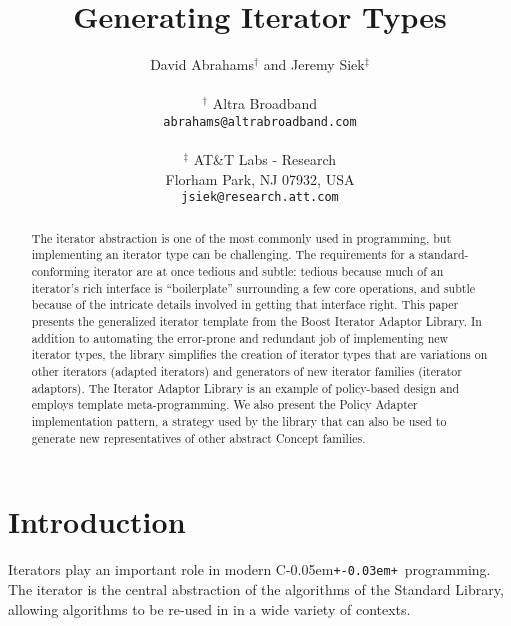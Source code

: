 \documentclass{netobjectdays}
\newcommand{\Cpp}{C\kern-0.05em\texttt{+\kern-0.03em+}}
\begin{document}
\title{Generating Iterator Types}

\author{David Abrahams$^\dag$ and Jeremy Siek$^\ddag$ \\
\\
$^\dag$ Altra Broadband \\
\texttt{abrahams@altrabroadband.com}\\
\\
$^\ddag$ AT\&T Labs - Research \\
Florham Park, NJ 07932, USA \\
\texttt{jsiek@research.att.com}
}

\maketitle

 \begin{abstract} $\!$The iterator abstraction is one of the most
commonly used in programming, but implementing an iterator type can be
challenging. The requirements for a standard-conforming iterator are
at once tedious and subtle: tedious because much of an iterator's rich
interface is ``boilerplate'' surrounding a few core operations, and
subtle because of the intricate details involved in getting that
interface right. This paper presents the generalized iterator template
from the Boost Iterator Adaptor Library. In addition to automating the
error-prone and redundant job of implementing new iterator types, the
library simplifies the creation of iterator types that are variations
on other iterators (adapted iterators) and generators of new iterator
families (iterator adaptors). The Iterator Adaptor Library is an
example of policy-based design and employs template
meta-programming. We also present the Policy Adapter implementation
pattern, a strategy used by the library that can also be used to
generate new representatives of other abstract Concept families.
\end{abstract}


\section{Introduction}


Iterators play an important role in modern \Cpp\ programming. The
iterator is the central abstraction of the algorithms of the Standard
Library, allowing algorithms to be re-used in in a wide variety of
contexts. 
\end{document}
